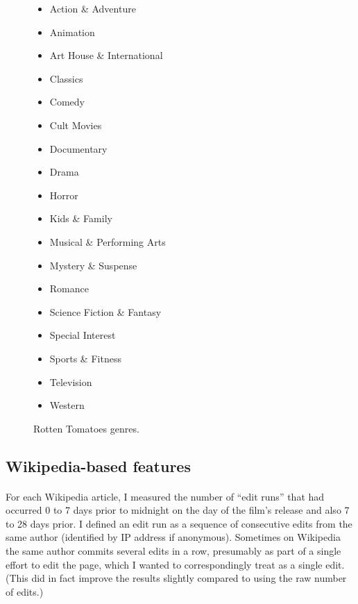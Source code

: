 \documentclass[10pt]{article}
\begin{document}
    \begin{figure}[h]
        \begin{multicols}{3}
            \begin{itemize}
                \footnotesize
                \item Action \& Adventure
                \item Animation
                \item Art House \& International
                \item Classics
                \item Comedy
                \item Cult Movies
                \item Documentary
                \item Drama
                \item Horror
                \item Kids \& Family
                \item Musical \& Performing Arts
                \item Mystery \& Suspense
                \item Romance
                \item Science Fiction \& Fantasy
                \item Special Interest
                \item Sports \& Fitness
                \item Television
                \item Western
                \normalsize
            \end{itemize}
        \end{multicols}
        \caption{Rotten Tomatoes genres.}
    \end{figure}
    
    \subsection{Wikipedia-based features}
    
    \paragraph{}
    For each Wikipedia article, I measured the number of ``edit runs'' that had occurred 0 to 7 days prior to midnight on the day of the film's release and also 7 to 28 days prior. I defined an edit run as a sequence of consecutive edits from the same author (identified by IP address if anonymous). Sometimes on Wikipedia the same author commits several edits in a row, presumably as part of a single effort to edit the page, which I wanted to correspondingly treat as a single edit. (This did in fact improve the results slightly compared to using the raw number of edits.)
    
\end{document}
